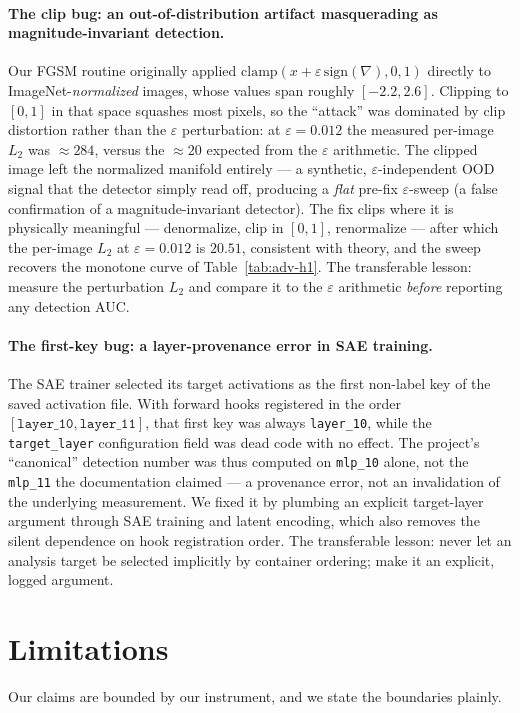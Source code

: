 \documentclass[../ppgc-tese.tex]{subfiles}
\begin{document}
\paragraph{The clip bug: an out-of-distribution artifact masquerading as
magnitude-invariant detection.} Our FGSM routine originally applied
$\mathrm{clamp}(x+\varepsilon\,\mathrm{sign}(\nabla),0,1)$ directly to
ImageNet-\emph{normalized} images, whose values span roughly $[-2.2,2.6]$. Clipping
to $[0,1]$ in that space squashes most pixels, so the ``attack'' was dominated by
clip distortion rather than the $\varepsilon$ perturbation: at $\varepsilon{=}0.012$
the measured per-image $L_2$ was $\approx284$, versus the $\approx20$ expected from
the $\varepsilon$ arithmetic. The clipped image left the normalized manifold entirely
--- a synthetic, $\varepsilon$-independent OOD signal that the detector simply read
off, producing a \emph{flat} pre-fix $\varepsilon$-sweep (a false confirmation of a
magnitude-invariant detector). The fix clips where it is physically meaningful ---
denormalize, clip in $[0,1]$, renormalize --- after which the per-image $L_2$ at
$\varepsilon{=}0.012$ is $20.51$, consistent with theory, and the sweep recovers the
monotone curve of Table~\ref{tab:adv-h1}. The transferable lesson: measure the
perturbation $L_2$ and compare it to the $\varepsilon$ arithmetic \emph{before}
reporting any detection AUC.

\paragraph{The first-key bug: a layer-provenance error in SAE training.} The SAE
trainer selected its target activations as the first non-label key of the saved
activation file. With forward hooks registered in the order
$[\texttt{layer\_10},\texttt{layer\_11}]$, that first key was always
\texttt{layer\_10}, while the \texttt{target\_layer} configuration field was dead
code with no effect. The project's ``canonical'' detection number was thus computed
on \texttt{mlp\_10} alone, not the \texttt{mlp\_11} the documentation claimed --- a
provenance error, not an invalidation of the underlying measurement. We fixed it by
plumbing an explicit target-layer argument through SAE training and latent encoding,
which also removes the silent dependence on hook registration order. The transferable
lesson: never let an analysis target be selected implicitly by container ordering;
make it an explicit, logged argument.

\section{Limitations}
\label{sec:adv-limitations}
Our claims are bounded by our instrument, and we state the boundaries plainly.
\end{document}
